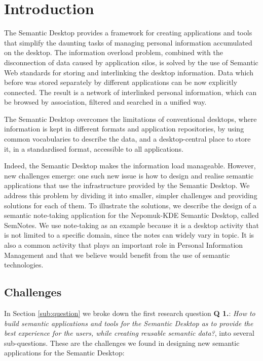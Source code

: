 \section{Introduction}
\label{sec:semnotesintro}

The Semantic Desktop provides a framework for creating applications and tools that simplify the daunting tasks of managing personal information accumulated on the desktop. 
The information overload problem, combined with the disconnection of data caused by application silos, is solved by the use of Semantic Web standards for storing and interlinking the desktop information. 
Data which before was stored separately by different applications can be now explicitly connected. The result is a network of interlinked personal information, which can be browsed by association, filtered and searched in a unified way. 

The Semantic Desktop overcomes the limitations of conventional desktops, where information is kept in different formats and application repositories, by using common vocabularies to describe the data, and a desktop-central place to store it, in a standardised format, accessible to all applications.

Indeed, the Semantic Desktop makes the information load manageable. However, new challenges emerge: one such new issue is how to design and realise semantic applications that use the infrastructure provided by the Semantic Desktop. We address this problem by dividing it into smaller, simpler challenges and providing solutions for each of them. To illustrate the solutions, we describe the design of a semantic note-taking application for the Nepomuk-KDE Semantic Desktop, called SemNotes. We use note-taking as an example because it is a desktop activity that is not limited to a specific domain, since the notes can widely vary in topic. It is also a common activity that plays an important role in Personal Information Management and that we believe would benefit from the use of semantic technologies.

\subsection{Challenges}
\label{sub:appchallenges}

In Section \ref{sub:question} we broke down the first research question \textbf{Q 1.}: \emph{How to build semantic applications and tools for the Semantic Desktop as to provide the best experience for the users, while creating reusable semantic data?}, into several sub-questions.
These are the challenges we found in designing new semantic applications for the Semantic Desktop:

